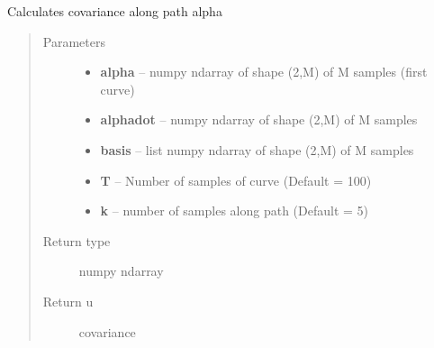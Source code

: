 \documentclass[letterpaper,10pt,english]{sphinxmanual}
\begin{document}
\begin{fulllineitems}
\label{geodesic:geodesic.cov_integral}
Calculates covariance along path alpha
\begin{quote}\begin{description}
\item[{Parameters}] \leavevmode\begin{itemize}
\item {} 
\textbf{alpha} -- numpy ndarray of shape (2,M) of M samples (first curve)

\item {} 
\textbf{alphadot} -- numpy ndarray of shape (2,M) of M samples

\item {} 
\textbf{basis} -- list numpy ndarray of shape (2,M) of M samples

\item {} 
\textbf{T} -- Number of samples of curve (Default = 100)

\item {} 
\textbf{k} -- number of samples along path (Default = 5)

\end{itemize}

\item[{Return type}] \leavevmode
numpy ndarray

\item[{Return u}] \leavevmode
covariance

\end{description}\end{quote}

\end{fulllineitems}

\end{document}
